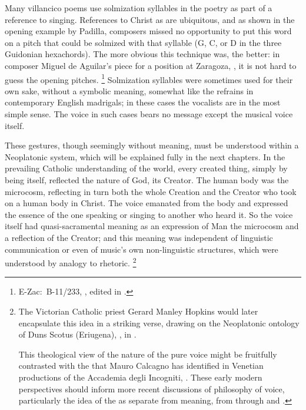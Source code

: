 Many villancico poems use solmization syllables in the poetry as part of a reference to singing.
References to Christ as   are ubiquitous, and as shown in the opening example by Padilla, composers missed no opportunity to put this word on a pitch that could be solmized with that syllable (G, C, or D in the three Guidonian hexachords).
The more obvious this technique was, the better: in composer Miguel de Aguilar's   piece for a position at Zaragoza,  , it is not hard to guess the opening pitches.%
	\footnote{%
	E-Zac:~B-11/233, , edited in \autocite[34--64]{Ezquerro:MME55}.
	}
Solmization syllables were sometimes used for their own sake, without a symbolic meaning, somewhat like the  refrains in contemporary English madrigals; in these cases the vocalists are  in the most simple sense.
The voice in such cases bears no message except the musical voice itself.

These gestures, though seemingly without meaning, must be understood within a Neoplatonic system, which will be explained fully in the next chapters.
In the prevailing Catholic understanding of the world, every created thing, simply by being itself, reflected the nature of God, its Creator.
The human body was the microcosm, reflecting in turn both the whole Creation and the Creator who took on a human body in Christ.
The voice emanated from the body and expressed the essence of the one speaking or singing to another who heard it.
So the voice itself had quasi-sacramental meaning as an expression of Man the microcosm and a reflection of the Creator; and this meaning was independent of linguistic communication or even of music's own non-linguistic structures, which were understood by analogy to rhetoric.%
	\footnote{%
The Victorian Catholic priest Gerard Manley Hopkins would later encapsulate this idea in a striking verse, drawing on the Neoplatonic ontology of Duns Scotus (Eriugena),  , in \autocite[95]{Hopkins:Poems}.

This theological view of the nature of the pure voice might be fruitfully contrasted with the  that Mauro Calcagno has identified in Venetian productions of the Accademia degli Incogniti, .
These early modern perspectives should inform more recent discussions of philosophy of voice, particularly the idea of the  as separate from meaning, from \autocite{Barthes:GrainOfVoice} through \autocite{Dolar:Voice} and \autocite{Cavarero:Voice}.
	}

